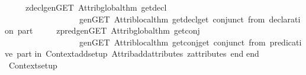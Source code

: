 \begin{isabellebody}
\ \ \ \ \ {\isacharparenleft}{\isachardoublequote}zdecl{\isachardoublequote}{\isacharcomma}{\isacharparenleft}gen{\isacharunderscore}GET\ Attrib{\isachardot}global{\isacharunderscore}thm\ get{\isacharunderscore}decl{}{\isacharcomma}\isanewline
\ \ \ \ \ \ \ \ \ \ \ \ \ \ \ \ \ \ gen{\isacharunderscore}GET\ Attrib{\isachardot}local{\isacharunderscore}thm\ get{\isacharunderscore}decl{}{\isacharparenright}{\isacharcomma}{\isachardoublequote}get\ conjunct\ from\ declaration\ part{\isachardoublequote}{\isacharparenright}{\isacharcomma}\isanewline
\ \ \ \ \ {\isacharparenleft}{\isachardoublequote}zpred{\isachardoublequote}{\isacharcomma}{\isacharparenleft}gen{\isacharunderscore}GET\ Attrib{\isachardot}global{\isacharunderscore}thm\ get{\isacharunderscore}conj{}{\isacharcomma}\isanewline
\ \ \ \ \ \ \ \ \ \ \ \ \ \ \ \ \ \ gen{\isacharunderscore}GET\ Attrib{\isachardot}local{\isacharunderscore}thm\ get{\isacharunderscore}conj{}{\isacharparenright}{\isacharcomma}{\isachardoublequote}get\ conjunct\ from\ predicative\ part{\isachardoublequote}{\isacharparenright}{\isacharbrackright}\isanewline
in\ Context{\isachardot}add{\isacharunderscore}setup\ {\isacharbrackleft}Attrib{\isachardot}add{\isacharunderscore}attributes\ z{\isacharunderscore}attributes{\isacharbrackright}\ end{\isacharsemicolon}\isanewline
\isanewline
end{\isacharsemicolon}\isanewline
{\isacharverbatimclose}\isanewline
\isanewline
{}\isamarkupfalse%
\ {\isachardoublequoteopen}Context{\isachardot}setup\ {\isacharparenleft}{\isacharparenright}{\isachardoublequoteclose}%
\endisatagML
{\isafoldML}%
%
\isadelimML
%
\endisadelimML
\isanewline
%
\isadelimtheory
\isanewline
%
\endisadelimtheory
%
\isatagtheory
{}\isamarkupfalse%
%
\endisatagtheory
{\isafoldtheory}%
%
\isadelimtheory
%
\endisadelimtheory
\isanewline
\ \isanewline
\end{isabellebody}%
